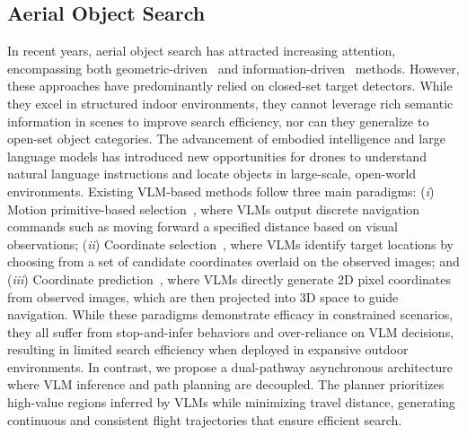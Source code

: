\subsection{Aerial Object Search}
In recent years, aerial object search has attracted increasing attention, encompassing both geometric-driven~\cite{luo2024star} and information-driven~\cite{dang2018autonomous} methods. However, these approaches have predominantly relied on closed-set target detectors. While they excel in structured indoor environments, they cannot leverage rich semantic information in scenes to improve search efficiency, nor can they generalize to open-set object categories.
The advancement of embodied intelligence and large language models has introduced new opportunities for drones to understand natural language instructions and locate objects in large-scale, open-world environments. Existing VLM-based methods follow three main paradigms: (\textit{i}) Motion primitive-based selection~\cite{ji2025towards,xiao2025uav}, where VLMs output discrete navigation commands such as moving forward a specified distance based on visual observations; (\textit{ii}) Coordinate selection~\cite{pardyl2025flysearch}, where VLMs identify target locations by choosing from a set of candidate coordinates overlaid on the observed images; and (\textit{iii}) Coordinate prediction~\cite{hu2025see}, where VLMs directly generate 2D pixel coordinates from observed images, which are then projected into 3D space to guide navigation.
While these paradigms demonstrate efficacy in constrained scenarios, they all suffer from stop-and-infer behaviors and over-reliance on VLM decisions, resulting in limited search efficiency when deployed in expansive outdoor environments. 
In contrast, we propose a dual-pathway asynchronous architecture where VLM inference and path planning are decoupled. The planner prioritizes high-value regions inferred by VLMs while minimizing travel distance, generating continuous and consistent flight trajectories that ensure efficient search.


